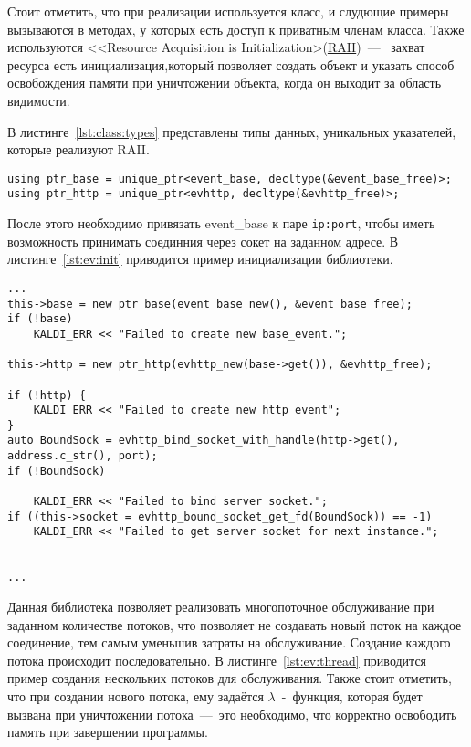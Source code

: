 Стоит отметить, что при реализации используется класс, и слудющие примеры вызываются
в методах, у которых есть доступ к приватным членам класса. Также используются
<<Resource Acquisition is Initialization>(\hyperlink{raii}{RAII})~---~
захват ресурса есть инициализация,который позволяет создать объект и указать
способ освобождения памяти при уничтожении объекта, когда он выходит за область
видимости.

В листинге~\ref{lst:class:types} представлены типы данных, уникальных указателей,
которые реализуют RAII.
\begin{lstlisting}[caption={Описание некоторых типов данных}, label={lst:class:types}]
using ptr_base = unique_ptr<event_base, decltype(&event_base_free)>;
using ptr_http = unique_ptr<evhttp, decltype(&evhttp_free)>;
\end{lstlisting}

После этого необходимо привязать event\_base к паре \texttt{ip:port}, чтобы иметь
возможность принимать соединния через сокет на заданном адресе. В листинге~\ref{lst:ev:init}
приводится пример инициализации библиотеки.

\begin{lstlisting}[caption={Пример инициализации библиотеки \textit{libevent}}, label={lst:ev:init}]
...
this->base = new ptr_base(event_base_new(), &event_base_free);
if (!base)
    KALDI_ERR << "Failed to create new base_event.";

this->http = new ptr_http(evhttp_new(base->get()), &evhttp_free);

if (!http) {
    KALDI_ERR << "Failed to create new http event";
}
auto BoundSock = evhttp_bind_socket_with_handle(http->get(), address.c_str(), port);
if (!BoundSock)

    KALDI_ERR << "Failed to bind server socket.";
if ((this->socket = evhttp_bound_socket_get_fd(BoundSock)) == -1)
    KALDI_ERR << "Failed to get server socket for next instance.";


...
\end{lstlisting}

Данная библиотека позволяет реализовать многопоточное обслуживание при заданном
количестве потоков, что позволяет не создавать новый поток на каждое соединение,
тем самым уменьшив затраты на обслуживание. Создание каждого потока происходит
последовательно. В листинге~\ref{lst:ev:thread} приводится пример создания
нескольких потоков для обслуживания. Также стоит отметить, что при создании
нового потока, ему задаётся $\lambda$~-~функция, которая будет вызвана при уничтожении
потока~---~это необходимо, что корректно освободить память при завершении программы.

